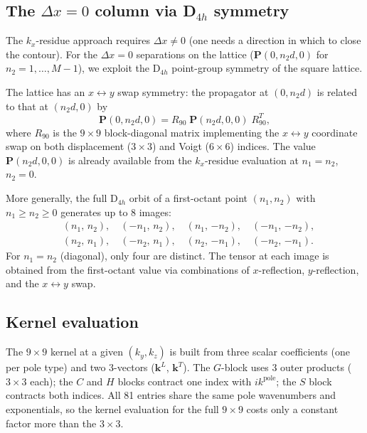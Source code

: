 \documentclass[11pt,a4paper]{article}
\newcommand{\bP}{\mathbf{P}}
\newcommand{\bk}{\mathbf{k}}
\begin{document}
\subsection{The \texorpdfstring{$\Delta x = 0$}{Δx = 0} column via \texorpdfstring{D$_{4h}$}{D4h} symmetry}
\label{sec:dx0}

The $k_x$-residue approach requires $\Delta x \ne 0$ (one needs a
direction in which to close the contour).
For the $\Delta x = 0$ separations on the lattice
($\bP(0, n_2 d, 0)$ for $n_2 = 1, \dots, M-1$),
we exploit the D$_{4h}$ point-group symmetry of the square lattice.

The lattice has an $x\leftrightarrow y$ swap symmetry: the
propagator at $(0, n_2 d)$ is related to that at $(n_2 d, 0)$ by
\begin{equation}\label{eq:rot90}
  \bP(0, n_2 d, 0) = R_{90}\;\bP(n_2 d, 0, 0)\;R_{90}^T,
\end{equation}
where $R_{90}$ is the $9\times 9$ block-diagonal matrix
implementing the $x\leftrightarrow y$ coordinate swap on both
displacement ($3\times 3$) and Voigt ($6\times 6$) indices.
The value $\bP(n_2 d, 0, 0)$ is already available from the
$k_x$-residue evaluation at $n_1 = n_2$, $n_2 = 0$.

More generally, the full D$_{4h}$ orbit of a first-octant point
$(n_1, n_2)$ with $n_1 \ge n_2 \ge 0$ generates up to 8 images:
\begin{equation}\label{eq:d4h_orbit}
\begin{aligned}
  &(n_1,\, n_2),\quad (-n_1,\, n_2),\quad
    (n_1,\, {-n_2}),\quad (-n_1,\, {-n_2}),\\
  &(n_2,\, n_1),\quad (-n_2,\, n_1),\quad
    (n_2,\, {-n_1}),\quad (-n_2,\, {-n_1}).
\end{aligned}
\end{equation}
For $n_1 = n_2$ (diagonal), only four are distinct.
The tensor at each image is obtained from the first-octant
value via combinations of $x$-reflection, $y$-reflection,
and the $x\leftrightarrow y$ swap.

\subsection{Kernel evaluation}\label{sec:kernel_eval}

The $9\times 9$ kernel at a given $(k_y, k_z)$ is
built from three scalar coefficients (one per pole type)
and two 3-vectors ($\bk^L$, $\bk^T$).
The $G$-block uses 3 outer products ($3\times 3$ each);
the $C$ and $H$ blocks contract one index with $ik^\text{pole}$;
the $S$ block contracts both indices.
All 81 entries share the same pole wavenumbers and
exponentials, so the kernel evaluation for the full
$9\times 9$ costs only a constant factor more than
the $3\times 3$.
\end{document}
